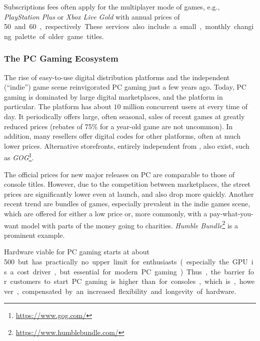 
Subscriptions fees often apply for the multiplayer mode of games, e.g., \textit{PlayStation Plus} or \textit{Xbox Live Gold} with annual prices of \SI{50}[\EUR] and \SI{60}[\EUR], respectively. These services also include a small, monthly changing palette of older game titles.




\subsubsection{The PC Gaming Ecosystem}
\label{sec:pcgaming}

The rise of easy-to-use digital distribution platforms and the independent (``indie'') game scene reinvigorated PC gaming just a few years ago. Today, PC gaming is dominated by large digital marketplaces, and the \steam platform in particular. The platform has about $10$ million concurrent users at every time of day. It periodically offers large, often seasonal, sales of recent games at greatly reduced prices (rebates of 75\% for a year-old game are not uncommon). In addition, many resellers offer digital codes for other platforms, often at much lower prices. Alternative storefronts, entirely independent from \steam, also exist, such as \textit{GOG}\footnote{\url{https://www.gog.com/}}.%

The official prices for new major releases on PC are comparable to those of console titles. However, due to the competition between marketplaces, the street prices are significantly lower even at launch, and also drop more quickly. Another recent trend are bundles of games, especially prevalent in the indie games scene, which are offered for either a low price or, more commonly, with a pay-what-you-want model with parts of the money going to charities. \textit{Humble Bundle}\footnote{\url{https://www.humblebundle.com/}} is a prominent example. %

Hardware viable for PC gaming starts at about \SI{500}[\EUR] but has practically no upper limit for enthusiasts (especially the \gls{GPU} is a cost driver, but essential for modern  PC gaming). Thus, the barrier for customers to start PC gaming is higher than for consoles, which is, however, compensated by an increased flexibility and longevity of hardware.

